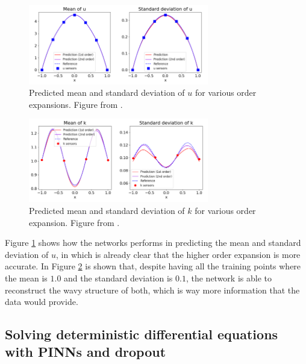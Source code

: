 \documentclass[11pt,a4paper]{article}
\begin{document}
\begin{figure}[H]
    \centering 
    \includegraphics[width=0.7\textwidth]{Images/Mean_STD_2ndorder.png}
    \captionsetup{justification=centering,margin=1cm}
    \caption{Predicted mean and standard deviation of \(u\) for various order expansions. Figure from \cite{Zhang_2019}.}
    \label{fig:mean_u}
\end{figure}
\begin{figure}[H]
    \centering 
    \includegraphics[width=0.7\textwidth]{Images/Mean_STD_k.png}
    \captionsetup{justification=centering,margin=1cm}
    \caption{Predicted mean and standard deviation of \(k\) for various order expansion. Figure from \cite{Zhang_2019}.}
    \label{fig:mean_k}
\end{figure}
Figure \ref{fig:mean_u} shows how the networks performs in predicting the mean and standard deviation of \(u\), in which is already clear that the higher order expansion is more accurate. In Figure \ref{fig:mean_k} is shown that, despite having all the training points where the mean is \(1.0\) and the standard deviation is \(0.1\), the network is able to reconstruct the wavy structure of both, which is way more information that the data would provide.

\subsection{Solving deterministic differential equations with PINNs and dropout}
\end{document}
